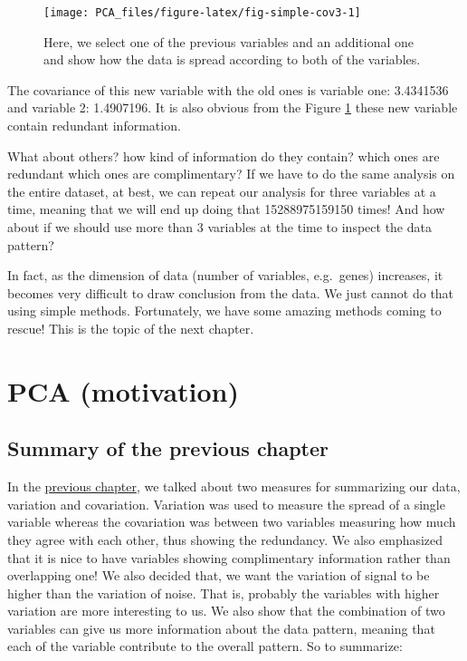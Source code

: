 \documentclass[
]{book}
\theoremstyle{definition}
\theoremstyle{definition}
\theoremstyle{definition}
\theoremstyle{remark}
\begin{document}
\begin{figure}

{\centering \texttt{[image: PCA\_files/figure-latex/fig-simple-cov3-1]} 

}

\caption{Here, we select one of the previous variables and an additional one and show how the data is spread according to both of the variables.}\label{fig:fig-simple-cov3}
\end{figure}

The covariance of this new variable with the old ones is variable one: 3.4341536 and variable 2: 1.4907196. It is also obvious from the Figure \ref{fig:fig-simple-cov3} these new variable contain redundant information.

What about others? how kind of information do they contain? which ones are redundant which ones are complimentary? If we have to do the same analysis on the entire dataset, at best, we can repeat our analysis for three variables at a time, meaning that we will end up doing that 15288975159150 times! And how about if we should use more than 3 variables at the time to inspect the data pattern?

In fact, as the dimension of data (number of variables, e.g.~genes) increases, it becomes very difficult to draw conclusion from the data. We just cannot do that using simple methods. Fortunately, we have some amazing methods coming to rescue! This is the topic of the next chapter.

\hypertarget{pcamot}{%
\chapter{PCA (motivation)}\label{pcamot}}

\hypertarget{summary-of-the-previous-chapter}{%
\section{Summary of the previous chapter}\label{summary-of-the-previous-chapter}}

In the \protect\hyperlink{intro}{previous chapter}, we talked about two measures for summarizing our data, variation and covariation. Variation was used to measure the spread of a single variable whereas the covariation was between two variables measuring how much they agree with each other, thus showing the redundancy. We also emphasized that it is nice to have variables showing complimentary information rather than overlapping one! We also decided that, we want the variation of signal to be higher than the variation of noise. That is, probably the variables with higher variation are more interesting to us. We also show that the combination of two variables can give us more information about the data pattern, meaning that each of the variable contribute to the overall pattern. So to summarize:
\end{document}
